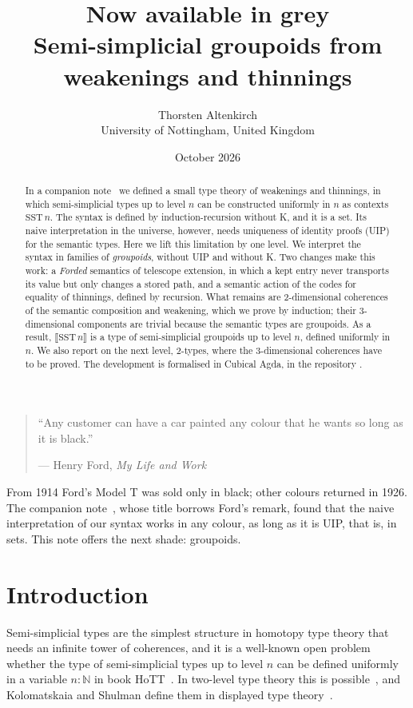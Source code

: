 \documentclass[11pt]{article}
\title{Now available in grey\\[0.5ex]
\large Semi-simplicial groupoids from weakenings and thinnings}
\author{Thorsten Altenkirch\\[0.5ex]
\small University of Nottingham, United Kingdom\\
\small\href{mailto:Thorsten.Altenkirch@nottingham.ac.uk}{\ag{Thorsten.Altenkirch@nottingham.ac.uk}}}
\date{October 2026}
\newcommand{\ag}[1]{\texttt{\detokenize{#1}}}
\newcommand{\repourl}{https://github.com/txa/sst-new}
\begin{document}
\maketitle

\begin{abstract}
In a companion note~\cite{obstruction} we defined a small type theory of
weakenings and thinnings, in which semi-simplicial types up to level $n$ can
be constructed uniformly in $n$ as contexts $\mathrm{SST}\,n$. The syntax is
defined by induction-recursion without K, and it is a set. Its naive
interpretation in the universe, however, needs uniqueness of identity proofs
(UIP) for the semantic types. Here we lift this limitation by one level. We
interpret the syntax in families of \emph{groupoids}, without UIP and without
K. Two changes make this work: a \emph{Forded} semantics of telescope
extension, in which a kept entry never transports its value but only changes a
stored path, and a semantic action of the codes for equality of thinnings,
defined by recursion. What remains are 2-dimensional coherences of the
semantic composition and weakening, which we prove by induction; their
3-dimensional components are trivial because the semantic types are
groupoids. As a result, $\llbracket\mathrm{SST}\,n\rrbracket$ is a type of
semi-simplicial groupoids up to level $n$, defined uniformly in $n$. We
also report on the next level, 2-types, where the 3-dimensional coherences have
to be proved. The development is formalised in Cubical Agda, in the repository
\href{\repourl}{\ag{github.com/txa/sst-new}}.
\end{abstract}

\begin{quote}\small
``Any customer can have a car painted any colour that he wants so long as it
is black.''\par\hfill --- Henry Ford, \emph{My Life and Work}~\cite{ford}
\end{quote}
\noindent
From 1914 Ford's Model T was sold only in black; other colours returned in
1926. The companion note~\cite{obstruction}, whose title borrows Ford's
remark, found that the naive interpretation of our syntax works in any
colour, as long as it is UIP, that is, in sets. This note offers the next
shade: groupoids.

\section{Introduction}

Semi-simplicial types are the simplest structure in homotopy type theory that
needs an infinite tower of coherences, and it is a well-known open problem
whether the type of semi-simplicial types up to level $n$ can be defined
uniformly in a variable $n:\mathbb N$ in book HoTT~\cite{ufias-sst,shulman-eat}.
In two-level type theory this is possible~\cite{ack-strict,acks-2ltt}, and
Kolomatskaia and Shulman define them in displayed type theory~\cite{dtt}.
\end{document}
